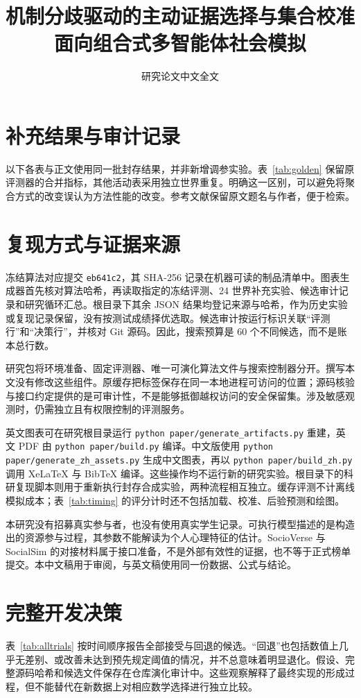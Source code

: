 \documentclass[UTF8,10pt,fontset=none]{ctexart}
\title{机制分歧驱动的主动证据选择与集合校准\\面向组合式多智能体社会模拟}
\author{研究论文中文全文}
\date{}
\begin{document}
\maketitle








\clearpage
\appendix
\section{补充结果与审计记录}
\label{app:results}
以下各表与正文使用同一批封存结果，并非新增调参实验。表~\ref{tab:golden} 保留原评测器的合并指标，其他活动表采用独立世界重复。明确这一区别，可以避免将聚合方式的改变误认为方法性能的改变。参考文献保留原文题名与作者，便于检索。





\FloatBarrier
\section{复现方式与证据来源}
\label{app:reproduction}
冻结算法对应提交 \texttt{eb641c2}，其 SHA-256 记录在机器可读的制品清单中。图表生成器首先核对算法哈希，再读取指定的冻结评测、24 世界补充实验、候选审计记录和研究循环汇总。根目录下其余 JSON 结果均登记来源与哈希，作为历史实验或复现记录保留，没有按测试成绩择优选取。候选审计按运行标识关联“评测行”和“决策行”，并核对 Git 源码。因此，搜索预算是 60 个不同候选，而不是账本总行数。

研究包将环境准备、固定评测器、唯一可演化算法文件与搜索控制器分开。撰写本文没有修改这些组件。原缓存把标签保存在同一本地进程可访问的位置；源码核验与接口约定提供的是可审计性，不是能够抵御越权访问的安全保留集。涉及敏感观测时，仍需独立且有权限控制的评测服务。

英文图表可在研究根目录运行 \texttt{python paper/generate\_artifacts.py} 重建，英文 PDF 由 \texttt{python paper/build.py} 编译。中文版使用 \texttt{python paper/generate\_zh\_assets.py} 生成中文图表，再以 \texttt{python paper/build\_zh.py} 调用 XeLaTeX 与 BibTeX 编译。这些操作均不运行新的研究实验。根目录下的科研复现脚本则用于重新执行封存合成实验，两种流程相互独立。缓存评测不计离线模拟成本；表~\ref{tab:timing} 的评分计时还不包括加载、校准、后验预测和绘图。

本研究没有招募真实参与者，也没有使用真实学生记录。可执行模型描述的是构造出的资源参与过程，其参数不能解读为个人心理特征的估计。SocioVerse 与 SocialSim 的对接材料属于接口准备，不是外部有效性的证据，也不等于正式榜单提交。本中文稿用于审阅，与英文稿使用同一份数据、公式与结论。

\section{完整开发决策}
\label{app:trials}
表~\ref{tab:alltrials} 按时间顺序报告全部接受与回退的候选。“回退”也包括数值上几乎无差别、或改善未达到预先规定阈值的情况，并不总意味着明显退化。假设、完整源码哈希和候选文件保存在仓库演化审计中。这些观察解释了最终实现的形成过程，但不能替代在新数据上对相应数学选择进行独立比较。
\footnotesize

\end{document}
